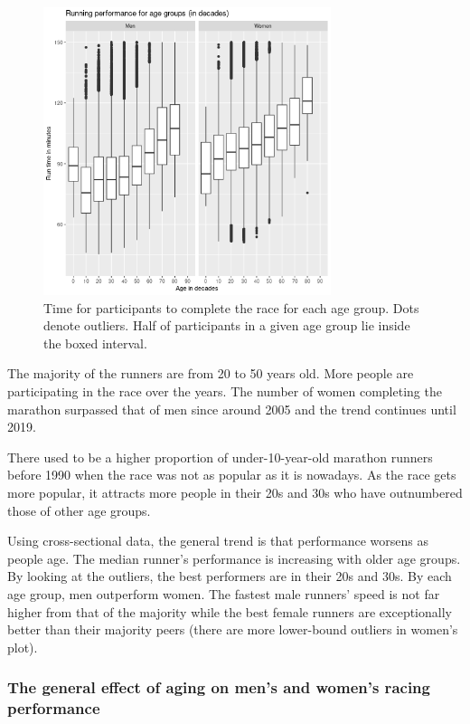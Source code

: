 \documentclass[12pt]{article}
\begin{document}
\begin{figure}[!hb]
	\centering
	\includegraphics[width = 0.75\textwidth]
	{../figure/boxplot_runtime_age-1.png}
	\caption{
		Time for participants to complete the race for each age group.
		Dots denote outliers. Half of participants in a given age group
		lie inside the boxed interval.
	}
	\label{box-plot}
\end{figure}

The majority of the runners are from 20 to 50 years old.
More people are participating in the race over the years.
The number of women completing the marathon surpassed that of men since
around 2005 and the trend continues until 2019.

There used to be a higher proportion of under-10-year-old marathon
runners before 1990 when the race was not as popular as it is nowadays.
As the race gets more popular, it attracts more people in their 20s and 30s
who have outnumbered those of other age groups.

Using cross-sectional data, the general trend is that performance worsens as
people age. The median runner's performance is increasing with older age groups.
By looking at the outliers, the best performers are in their 20s and 30s.
By each age group, men outperform women.
The fastest male runners' speed is not far higher from that of the majority
while the best female runners are exceptionally better than their majority
peers (there are more lower-bound outliers in women's plot).

\subsubsection*{The general effect of aging on
	men's and women's racing performance}
\end{document}
